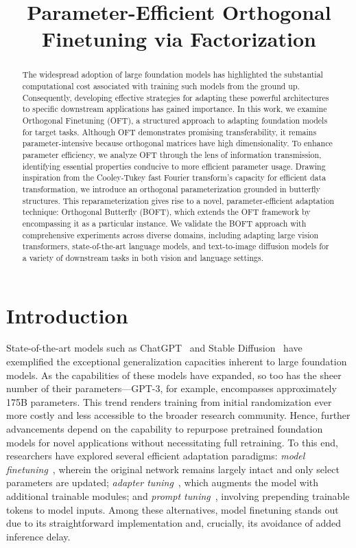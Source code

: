 \title{Parameter-Efficient Orthogonal Finetuning via Factorization}

\begin{abstract}
The widespread adoption of large foundation models has highlighted the substantial computational cost associated with training such models from the ground up. Consequently, developing effective strategies for adapting these powerful architectures to specific downstream applications has gained importance. In this work, we examine Orthogonal Finetuning (OFT), a structured approach to adapting foundation models for target tasks. Although OFT demonstrates promising transferability, it remains parameter-intensive because orthogonal matrices have high dimensionality. To enhance parameter efficiency, we analyze OFT through the lens of information transmission, identifying essential properties conducive to more efficient parameter usage. Drawing inspiration from the Cooley-Tukey fast Fourier transform's capacity for efficient data transformation, we introduce an orthogonal parameterization grounded in butterfly structures. This reparameterization gives rise to a novel, parameter-efficient adaptation technique: Orthogonal Butterfly (BOFT), which extends the OFT framework by encompassing it as a particular instance. We validate the BOFT approach with comprehensive experiments across diverse domains, including adapting large vision transformers, state-of-the-art language models, and text-to-image diffusion models for a variety of downstream tasks in both vision and language settings.
\end{abstract}

\section{Introduction}

State-of-the-art models such as ChatGPT~\cite{brown2020language,chen2021evaluating} and Stable Diffusion~\cite{rombach2022high} have exemplified the exceptional generalization capacities inherent to large foundation models. As the capabilities of these models have expanded, so too has the sheer number of their parameters—GPT-3, for example, encompasses approximately 175B parameters. This trend renders training from initial randomization ever more costly and less accessible to the broader research community. Hence, further advancements depend on the capability to repurpose pretrained foundation models for novel applications without necessitating full retraining. To this end, researchers have explored several efficient adaptation paradigms: \emph{model finetuning}~\cite{hulora2022,zaken2022bitfit,guo2020parameter,raffel2020exploring,qiu2023controlling,zhang2022adaptive,chavan2023one}, wherein the original network remains largely intact and only select parameters are updated; \emph{adapter tuning}~\cite{rebuffi2017learning,houlsby2019parameter,pfeiffer2020adapterfusion,lin2020exploring,he2021towards}, which augments the model with additional trainable modules; and \emph{prompt tuning}~\cite{li2021prefix,lester2021power}, involving prepending trainable tokens to model inputs. Among these alternatives, model finetuning stands out due to its straightforward implementation and, crucially, its avoidance of added inference delay.


